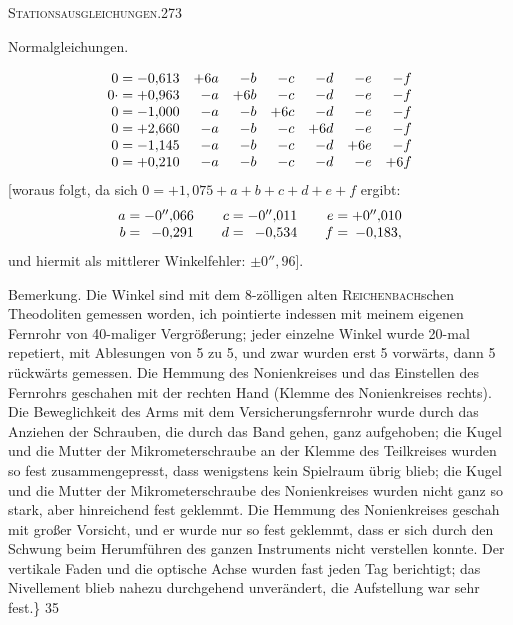 \clearpage
\noindent\mbox{}\hfill\textsc{Stationsausgleichungen.}\hfill273\par\medskip
\begin{center}Normalgleichungen.\end{center}
\[
\begin{array}{r@{\;}c@{\;}rrrrrrr}
0&=&-0{,}613&+6a&-b&-c&-d&-e&-f\\
0\mathord{\cdot}&=&+0{,}963&-a&+6b&-c&-d&-e&-f\\
0&=&-1{,}000&-a&-b&+6c&-d&-e&-f\\
0&=&+2{,}660&-a&-b&-c&+6d&-e&-f\\
0&=&-1{,}145&-a&-b&-c&-d&+6e&-f\\
0&=&+0{,}210&-a&-b&-c&-d&-e&+6f
\end{array}
\]
[woraus folgt, da sich $0=+1{,}075+a+b+c+d+e+f$ ergibt:
\[
\begin{array}{r@{\;}c@{\;}r@{\qquad}r@{\;}c@{\;}r@{\qquad}r@{\;}c@{\;}r}
a&=&-0''{,}066&c&=&-0''{,}011&e&=&+0''{,}010\\
b&=&-0{,}291&d&=&-0{,}534&f&=&-0{,}183,
\end{array}
\]
und hiermit als mittlerer Winkelfehler: $\pm0''{,}96$].

Bemerkung. Die Winkel sind mit dem 8-zölligen alten \textsc{Reichenbach}schen Theodoliten gemessen worden, ich pointierte indessen mit meinem eigenen Fernrohr von 40-maliger Vergrößerung; jeder einzelne Winkel wurde 20-mal repetiert, mit Ablesungen von 5 zu 5, und zwar wurden erst 5 vorwärts, dann 5 rückwärts gemessen. Die Hemmung des Nonienkreises und das Einstellen des Fernrohrs geschahen mit der rechten Hand (Klemme des Nonienkreises rechts). Die Beweglichkeit des Arms mit dem Versicherungsfernrohr wurde durch das Anziehen der Schrauben, die durch das Band gehen, ganz aufgehoben; die Kugel und die Mutter der Mikrometerschraube an der Klemme des Teilkreises wurden so fest zusammengepresst, dass wenigstens kein Spielraum übrig blieb; die Kugel und die Mutter der Mikrometerschraube des Nonienkreises wurden nicht ganz so stark, aber hinreichend fest geklemmt. Die Hemmung des Nonienkreises geschah mit großer Vorsicht, und er wurde nur so fest geklemmt, dass er sich durch den Schwung beim Herumführen des ganzen Instruments nicht verstellen konnte. Der vertikale Faden und die optische Achse wurden fast jeden Tag berichtigt; das Nivellement blieb nahezu durchgehend unverändert, die Aufstellung war sehr fest.\}
\vfill
{}\hfill35

